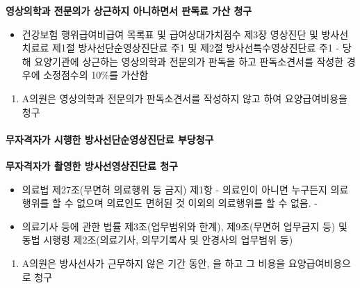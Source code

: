 \textbf{영상의학과 전문의가 상근하지 아니하면서 판독료 가산 청구}
\begin{description}\tightlist
\item[관련근거] 
\begin{itemize}\tightlist
\item 건강보험 행위급여\cntrdot{}비급여 목록표 및 급여상대가치점수 제3장 영상진단 및 방사선치료료 제1절 방사선단순영상진단료 주1 및 제2절 방사선특수영상진단료 주1 - 당해 요양기관에 상근하는 영상의학과 전문의가 판독을 하고 판독소견서를 작성한 경우에 소정점수의 10\%를 가산함
\end{itemize}
\item[부당사례]
\begin{enumerate}[1)]\tightlist
\item   A의원은 영상의학과 전문의가 판독소견서를 작성하지 않고 하여 요양급여비용을 청구
\end{enumerate}
\end{description}

\paragraph{무자격자가 시행한 방사선단순영상진단료 부당청구}\par
\textbf{무자격자가 촬영한 방사선영상진단료 청구}
\begin{description}\tightlist
\item[관련근거] 
\begin{itemize}\tightlist
\item 의료법 제27조(무면허 의료행위 등 금지) 제1항 - 의료인이 아니면 누구든지 의료행위를 할 수 없으며 의료인도 면허된 것 이외의 의료행위를 할 수 없음. -
\item 의료기사 등에 관한 법률 제3조(업무범위와 한계), 제9조(무면허 업무금지 등) 및 동법 시행령 제2조(의료기사, 의무기록사 및 안경사의 업무범위 등)
\end{itemize}
\item[부당사례]
\begin{enumerate}[1)]\tightlist
\item  A의원은 방사선사가 근무하지 않은 기간 동안, 을 하고 그 비용을 요양급여비용으로 청구
\end{enumerate}
\end{description}

